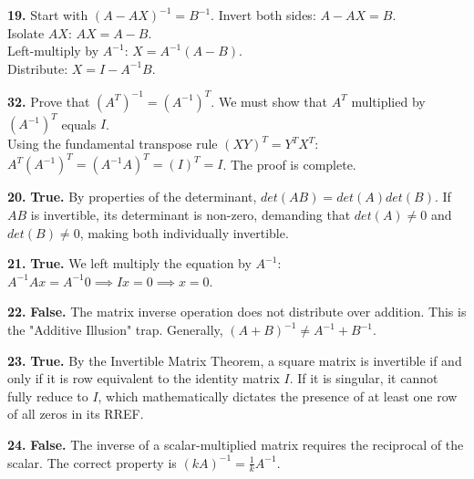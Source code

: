 \documentclass{article}
\begin{document}
\vspace{5pt}
\noindent
\textbf{19.} Start with $(A - AX)^{-1} = B^{-1}$. Invert both sides: $A - AX = B$. \\
Isolate $AX$: $AX = A - B$. \\
Left-multiply by $A^{-1}$: $X = A^{-1}(A - B)$. \\
Distribute: $X = I - A^{-1}B$. 

\vspace{5pt}
\noindent
\textbf{32.} Prove that $(A^T)^{-1} = (A^{-1})^T$. We must show that $A^T$ multiplied by $(A^{-1})^T$ equals $I$. \\
Using the fundamental transpose rule $(XY)^T = Y^T X^T$: \\
$A^T (A^{-1})^T = (A^{-1} A)^T = (I)^T = I$. The proof is complete.

\vspace{5pt}
\noindent
\textbf{20.} \textbf{True.} By properties of the determinant, $det(AB) = det(A)det(B)$. If $AB$ is invertible, its determinant is non-zero, demanding that $det(A) \neq 0$ and $det(B) \neq 0$, making both individually invertible.

\vspace{5pt}
\noindent
\textbf{21.} \textbf{True.} We left multiply the equation by $A^{-1}$: $A^{-1}Ax = A^{-1}0 \implies Ix = 0 \implies x = 0$.

\vspace{5pt}
\noindent
\textbf{22.} \textbf{False.} The matrix inverse operation does not distribute over addition. This is the "Additive Illusion" trap. Generally, $(A+B)^{-1} \neq A^{-1} + B^{-1}$.

\vspace{5pt}
\noindent
\textbf{23.} \textbf{True.} By the Invertible Matrix Theorem, a square matrix is invertible if and only if it is row equivalent to the identity matrix $I$. If it is singular, it cannot fully reduce to $I$, which mathematically dictates the presence of at least one row of all zeros in its RREF.

\vspace{5pt}
\noindent
\textbf{24.} \textbf{False.} The inverse of a scalar-multiplied matrix requires the reciprocal of the scalar. The correct property is $(kA)^{-1} = \frac{1}{k} A^{-1}$.
\end{document}
